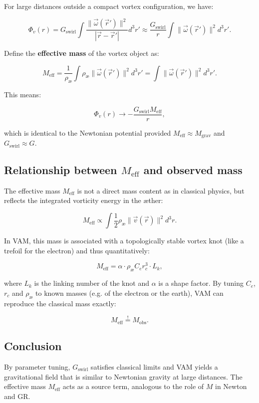 For large distances outside a compact vortex configuration, we have:

\begin{equation}
  \Phi_v(r) = G_{\text{swirl}} \int \frac{\|\vec{\omega}(\vec{r}')\|^2}{|\vec{r} - \vec{r}'|} d^3r' \approx \frac{G_{\text{swirl}}}{r} \int \|\vec{\omega}(\vec{r}')\|^2 d^3r'.
\end{equation}

Define the \textbf{effective mass} of the vortex object as:

\begin{equation}
  M_{\text{eff}} = \frac{1}{\rho_{\text{æ}}} \int \rho_{\text{æ}} \|\vec{\omega}(\vec{r}')\|^2 d^3r' = \int \|\vec{\omega}(\vec{r}')\|^2 d^3r'.
\end{equation}

This means:

\begin{equation}
  \Phi_v(r) \to -\frac{G_{\text{swirl}} M_{\text{eff}}}{r},
\end{equation}

which is identical to the Newtonian potential provided $M_{\text{eff}} \approx M_{\text{grav}}$ and $G_{\text{swirl}} \approx G$.

\subsection{Relationship between $M_{\text{eff}}$ and observed mass}

The effective mass $M_{\text{eff}}$ is not a direct mass content as in classical physics, but reflects the integrated vorticity energy in the æther:

\begin{equation}
  M_{\text{eff}} \propto \int \frac{1}{2} \rho_{\text{æ}} \|\vec{v}(\vec{r})\|^2 d^3r.
\end{equation}

In VAM, this mass is associated with a topologically stable vortex knot (like a trefoil for the electron) and thus quantitatively:

\begin{equation}
  M_{\text{eff}} = \alpha \cdot \rho_{\text{æ}} C_e r_c^3 \cdot L_k,
\end{equation}

where $L_k$ is the linking number of the knot and $\alpha$ is a shape factor. By tuning $C_e$, $r_c$ and $\rho_{\text{æ}}$ to known masses (e.g. of the electron or the earth), VAM can reproduce the classical mass exactly:

\begin{equation}
  M_{\text{eff}} \overset{!}{=} M_{\text{obs}}.

\end{equation}

\subsection{Conclusion}

By parameter tuning, $G_{\text{swirl}}$ satisfies classical limits and VAM yields a gravitational field that is similar to Newtonian gravity at large distances. The effective mass $M_{\text{eff}}$ acts as a source term, analogous to the role of $M$ in Newton and GR.